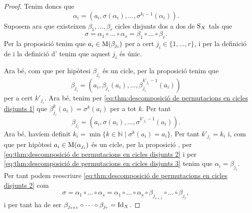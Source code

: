 \documentclass[../../Main.tex]{subfiles}
\begin{document}
\begin{theorem}
\begin{proof}
			
			Tenim doncs que
			\begin{equation}
			\label{eq:thm:descomposició de permutacions en cicles disjunts 3}
			\alpha_{i}=\left(a_{i},\sigma(\alpha_{i}),\dots,\sigma^{k_{i}-1}(\alpha_{i})\right).
			\end{equation}
			Suposem ara que existeixen \(\beta_{1},\dots,\beta_{r}\) cicles disjunts dos a dos de \(\operatorname{S}_{X}\) tals que
			\begin{equation}
			\label{eq:thm:descomposició de permutacions en cicles disjunts 1}
			\sigma=\alpha_{1}\circ\dots\circ\alpha_{s}=\beta_{1}\circ\dots\circ\beta_{r}.
			\end{equation}
			Per la proposició  tenim que \(a_{i}\in\operatorname{M}(\beta_{j_{i}})\) per a cert \(j_{i}\in\{1,\dots,r\}\), i per la definició de  i la definició d' tenim que aquest \(j_{i}\) és únic.
			
			Ara bé, com que per hipòtesi \(\beta_{j_{i}}\) és un cicle, per la proposició  tenim que
			\[\beta_{j_{i}}=\left(a_{i},\beta_{j_{i}}(a_{i}),\dots,\beta^{k'_{j_{i}}-1}_{j_{i}}(a_{i})\right)\]
			per a cert \(k'_{j_{i}}\). Ara bé, tenim per \eqref{eq:thm:descomposició de permutacions en cicles disjunts 1} que \(\beta^{k}_{j_{i}}(a_{i})=\sigma^{k}(a_{i})\) per a tot \(k\). Per tant
			\[\beta_{j_{i}}=\left(a_{i},\sigma(a_{i}),\dots,\sigma^{k'_{j_{i}}-1}(a_{i})\right).\]
			Ara bé, havíem definit \(k_{i}=\min\{k\in\mathbb{N}\mid\sigma^{k}(a_{i})=a_{i}\}\). Per tant \(k'_{j_{i}}=k_{i}\) i, com que per hipòtesi \(a_{i}\in\operatorname{M}(\alpha_{j_{i}})\) és un cicle, per la proposició , per \eqref{eq:thm:descomposició de permutacions en cicles disjunts 2} i per \eqref{eq:thm:descomposició de permutacions en cicles disjunts 3} tenim que \(\alpha_{i}=\beta_{j_{i}}\). Per tant podem reescriure \eqref{eq:thm:descomposició de permutacions en cicles disjunts 2} com
			\[\sigma=\alpha_{1}\circ\dots\circ\alpha_{s}=\alpha_{1}\circ\dots\circ\alpha_{s}\circ\beta_{j_{s+1}}\circ\dots\circ\beta_{j_{r}},\]
			i per tant ha de ser \(\beta_{j_{s+1}}\circ\dots\circ\beta_{j_{r}}=\operatorname{Id}_{X}\).
		\end{proof}
	\end{theorem}
\end{document}

